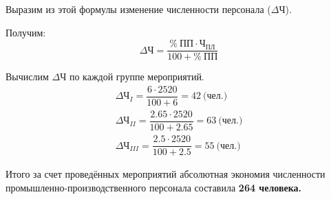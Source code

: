 Выразим из этой формулы изменение численности персонала ($ \Delta\text{Ч} $).

Получим:
\begin{equation}
\Delta\text{Ч} = \dfrac{\% ~ \text{ПП} \cdot \text{Ч}_{\text{ПЛ}}}{100 + \% ~ \text{ПП}}
\end{equation}

Вычислим $ \Delta\text{Ч} $ по каждой группе мероприятий.
\begin{align*}
  \Delta\text{Ч}_{I} = \dfrac{6 \cdot 2520}{100 + 6} = 42 ~ \text{(чел.)} \\
  \Delta\text{Ч}_{II} = \dfrac{2.65 \cdot 2520}{100 + 2.65} = 63 ~ \text{(чел.)} \\
  \Delta\text{Ч}_{III} = \dfrac{2.5 \cdot 2520}{100 + 2.5} = 55 ~ \text{(чел.)}
\end{align*}

Итого за счет проведённых мероприятий абсолютная экономия численности
промышленно-производственного персонала составила \textbf{264 человека.}

\newpage
